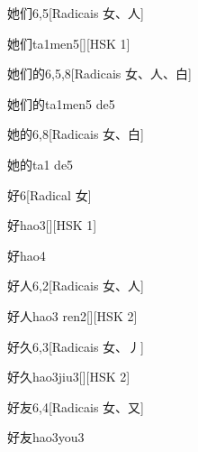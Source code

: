 \begin{entry}{她们}{6,5}[Radicais ⼥、⼈]
  \begin{phonetics}{她们}{ta1men5}[][HSK 1]
  \end{phonetics}
\end{entry}

\begin{entry}{她们的}{6,5,8}[Radicais ⼥、⼈、⽩]
  \begin{phonetics}{她们的}{ta1men5 de5}
  \end{phonetics}
\end{entry}

\begin{entry}{她的}{6,8}[Radicais ⼥、⽩]
  \begin{phonetics}{她的}{ta1 de5}
  \end{phonetics}
\end{entry}

\begin{entry}{好}{6}[Radical ⼥]
  \begin{phonetics}{好}{hao3}[][HSK 1]
  \end{phonetics}
  \begin{phonetics}{好}{hao4}
  \end{phonetics}
\end{entry}

\begin{entry}{好人}{6,2}[Radicais ⼥、⼈]
  \begin{phonetics}{好人}{hao3 ren2}[][HSK 2]
  \end{phonetics}
\end{entry}

\begin{entry}{好久}{6,3}[Radicais ⼥、⼃]
  \begin{phonetics}{好久}{hao3jiu3}[][HSK 2]
  \end{phonetics}
\end{entry}

\begin{entry}{好友}{6,4}[Radicais ⼥、⼜]
  \begin{phonetics}{好友}{hao3you3}
  \end{phonetics}
\end{entry}

